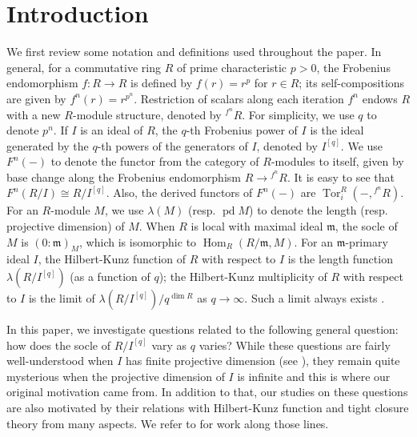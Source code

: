 \documentclass[draft]{amsart}
\theoremstyle{definition}
\numberwithin{equation}{theorem}
\begin{document}
\section{Introduction}
We first review some notation and 
definitions used throughout the paper.
In general, for a commutative ring $R$ of prime characteristic $p>0$, the Frobenius endomorphism $f\colon R \to R$ is defined by $f(r)=r^p$ for $r \in
R$; its self-compositions are given by $f^n(r) = r^{p^n}$. Restriction of scalars along each iteration $f^n$ endows $R$ with a new $R$-module structure, denoted by ${}^{f^n}\!\! R$.
For simplicity, we use $q$ to denote $p^n$. If $I$ is an ideal of $R$, the $q$-th Frobenius power of $I$ is the
ideal generated by the $q$-th powers of the generators of $I$, denoted by $I^{[q]}$. We use $F^n(-)$ to denote the functor from the category of $R$-modules to itself, given by base change along the Frobenius endomorphism $R \to {}^{f^n}\!\! R$. It is easy to see that $F^n(R/I) \cong R/I^{[q]}$. Also, the derived functors of $F^n(-)$ are  ${\mathop{\mathrm{Tor}}\nolimits}^R_i (-,{}^{f^n}\!\! R)$. For an $R$-module $M$, we use
 ${\lambda}(M)$ (resp. ${\mathop{\mathrm{pd}}\nolimits} M$) to denote the
length (resp. projective dimension) of $M$. When $R$ is local with maximal ideal ${\mathfrak{m}}$, the socle of $M$ is $(0: {\mathfrak{m}})_M$, which is isomorphic to ${\mathop{\mathrm{Hom}}\nolimits}_R(R/{\mathfrak{m}}, M)$. For an ${\mathfrak{m}}$-primary ideal $I$, the Hilbert-Kunz function of $R$ with respect to $I$  is the length function ${\lambda} (R/I^{[q]})$ (as a function of $q$); the Hilbert-Kunz multiplicity of $R$ with respect to $I$ is the limit of ${\lambda} (R/I^{[q]})/q^{\dim R}$ as $q \to {{\infty}}$. Such a limit always exists \cite{M1}.

In this paper, we investigate questions related to the following general question: how does the socle of $R/I^{[q]}$ vary as $q$ varies? While these questions are fairly well-understood when $I$ has finite projective dimension (see \cite{KV}), they remain quite mysterious when the projective dimension of $I$ is infinite and this is where our original motivation came from. In addition to that, our studies on these questions are also motivated by their relations with Hilbert-Kunz function and tight closure theory from many aspects. We refer to \cite{BC, B1, Y} for work along those lines.  
\end{document}
